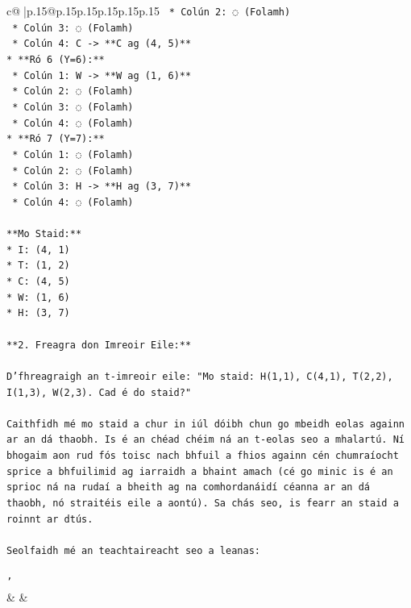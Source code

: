 \documentclass{article}
\begin{document}
{\begin{supertabular}{c@{$\;$}|p{.15\linewidth}@{}p{.15\linewidth}p{.15\linewidth}p{.15\linewidth}p{.15\linewidth}p{.15\linewidth}}
{{{\texttt{    *   Colún 2: ◌ (Folamh)} \\
\texttt{    *   Colún 3: ◌ (Folamh)} \\
\texttt{    *   Colún 4: C {-}> **C ag (4, 5)**} \\
\texttt{*   **Ró 6 (Y=6):**} \\
\texttt{    *   Colún 1: W {-}> **W ag (1, 6)**} \\
\texttt{    *   Colún 2: ◌ (Folamh)} \\
\texttt{    *   Colún 3: ◌ (Folamh)} \\
\texttt{    *   Colún 4: ◌ (Folamh)} \\
\texttt{*   **Ró 7 (Y=7):**} \\
\texttt{    *   Colún 1: ◌ (Folamh)} \\
\texttt{    *   Colún 2: ◌ (Folamh)} \\
\texttt{    *   Colún 3: H {-}> **H ag (3, 7)**} \\
\texttt{    *   Colún 4: ◌ (Folamh)} \\
\\ 
\texttt{**Mo Staid:**} \\
\texttt{*   I: (4, 1)} \\
\texttt{*   T: (1, 2)} \\
\texttt{*   C: (4, 5)} \\
\texttt{*   W: (1, 6)} \\
\texttt{*   H: (3, 7)} \\
\\ 
\texttt{**2. Freagra don Imreoir Eile:**} \\
\\ 
\texttt{D'fhreagraigh an t{-}imreoir eile: "Mo staid: H(1,1), C(4,1), T(2,2), I(1,3), W(2,3). Cad é do staid?"} \\
\\ 
\texttt{Caithfidh mé mo staid a chur in iúl dóibh chun go mbeidh eolas againn ar an dá thaobh. Is é an chéad chéim ná an t{-}eolas seo a mhalartú. Ní bhogaim aon rud fós toisc nach bhfuil a fhios againn cén chumraíocht sprice a bhfuilimid ag iarraidh a bhaint amach (cé go minic is é an sprioc ná na rudaí a bheith ag na comhordanáidí céanna ar an dá thaobh, nó straitéis eile a aontú). Sa chás seo, is fearr an staid a roinnt ar dtús.} \\
\\ 
\texttt{Seolfaidh mé an teachtaireacht seo a leanas:} \\
\\ 
\texttt{'} \\
            }
        }
    }
    & & \\ \\


\end{supertabular}}
\end{document}
